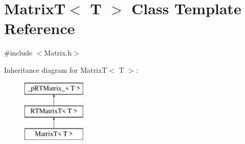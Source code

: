 \hypertarget{classMatrixT}{
\section{MatrixT$<$ T $>$ Class Template Reference}
\label{classMatrixT}
}


{\ttfamily \#include $<$Matrix.h$>$}

Inheritance diagram for MatrixT$<$ T $>$:\begin{figure}[H]
\begin{center}
\leavevmode
\includegraphics[height=3.000000cm]{classMatrixT}
\end{center}
\end{figure}
